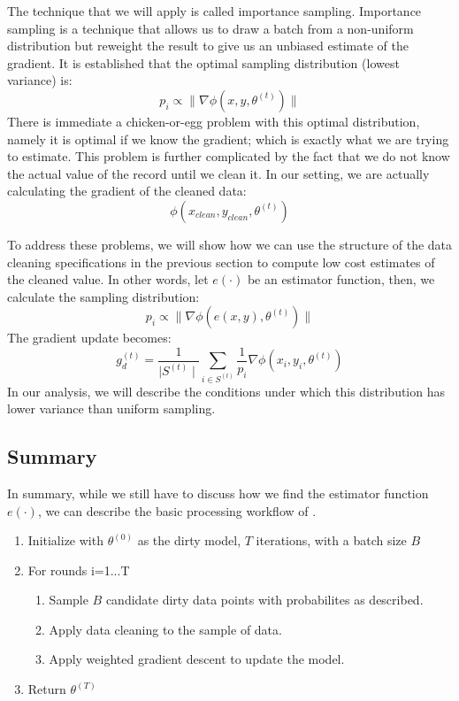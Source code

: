 The technique that we will apply is called importance sampling.
Importance sampling is a technique that allows us to draw a batch from a non-uniform distribution but reweight the result to give us an unbiased estimate of the gradient.
It is established \cite{zhao2014stochastic} that the optimal sampling distribution (lowest variance) is:
\[p_{i}\propto\|\nabla\phi(x,y,\theta^{(t)})\|\]
There is immediate a chicken-or-egg problem with this optimal distribution, namely it is optimal if we know the gradient; which is exactly what we are trying to estimate.
This problem is further complicated by the fact that we do not know the actual value
of the record until we clean it.
In our setting, we are actually calculating the gradient of the cleaned data:
\[\phi(x_{clean},y_{clean},\theta^{(t)})\]

To address these problems, we will show how we can use the structure of the data cleaning specifications in the previous section to compute low cost estimates of the cleaned value.
In other words, let $e(\cdot)$ be an estimator function, then, we calculate the sampling distribution: 
\[p_{i}\propto\|\nabla\phi(e(x,y),\theta^{(t)}) \|\]
The gradient update becomes:
\[g_d^{(t)} = \frac{1}{\mid S^{(t)} \mid}\sum_{i\in S^{(t)}}\frac{1}{p_{i}}\nabla\phi(x_{i},y_{i},\theta^{(t)})\]
In our analysis, we will describe the conditions under which this distribution has lower variance than uniform sampling.

\subsection{Summary}
In summary, while we still have to discuss how we find the estimator function $e(\cdot)$, we can describe the basic processing workflow of \sys.
\begin{enumerate}[noitemsep]
\item Initialize with $\theta^{(0)}$ as the dirty model, $T$ iterations, with a batch size $B$
\item For rounds i=1...T
\begin{enumerate}
	\item Sample $B$ candidate dirty data points with probabilites as described.
	\item Apply data cleaning to the sample of data.
	\item Apply weighted gradient descent to update the model.
\end{enumerate}
\item Return $\theta^{(T)}$
\end{enumerate} 